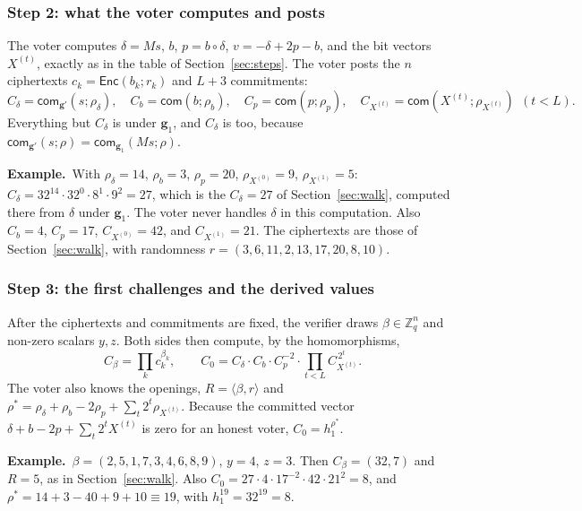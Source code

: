 \documentclass[11pt,a4paper]{article}
\newcommand{\Z}{\mathbb{Z}}
\newcommand{\Enc}{\mathsf{Enc}}
\newcommand{\com}{\mathsf{com}}
\newcommand{\ex}[1]{\par\medskip\noindent\textbf{Example.}~#1\par\medskip}
\theoremstyle{remark}
\begin{document}
\subsubsection*{Step 2: what the voter computes and posts}
The voter computes $\delta = Ms$, $b$, $p = b \circ \delta$, $v = -\delta
+ 2p - b$, and the bit vectors $X^{(t)}$, exactly as in the table of
Section~\ref{sec:steps}. The voter posts the $n$ ciphertexts $c_k =
\Enc(b_k; r_k)$ and $L + 3$ commitments:
\[
  C_\delta = \com_{\mathbf{g}'}(s; \rho_\delta), \quad
  C_b = \com(b; \rho_b), \quad
  C_p = \com(p; \rho_p), \quad
  C_{X^{(t)}} = \com(X^{(t)}; \rho_{X^{(t)}}) \ \ (t < L).
\]
Everything but $C_\delta$ is under $\mathbf{g}_1$, and $C_\delta$ is too,
because $\com_{\mathbf{g}'}(s; \rho) = \com_{\mathbf{g}_1}(Ms; \rho)$.

\ex{With $\rho_\delta = 14$, $\rho_b = 3$, $\rho_p = 20$, $\rho_{X^{(0)}}
= 9$, $\rho_{X^{(1)}} = 5$: $C_\delta = 32^{14} \cdot 32^{0} \cdot 8^{1}
\cdot 9^{2} = 27$, which is the $C_\delta = 27$ of
Section~\ref{sec:walk}, computed there from $\delta$ under
$\mathbf{g}_1$. The voter never handles $\delta$ in this computation.
Also $C_b = 4$, $C_p = 17$, $C_{X^{(0)}} = 42$, and $C_{X^{(1)}} = 21$.
The ciphertexts are those of Section~\ref{sec:walk}, with randomness $r =
(3, 6, 11, 2, 13, 17, 20, 8, 10)$.}

\subsubsection*{Step 3: the first challenges and the derived values}
After the ciphertexts and commitments are fixed, the verifier draws $\beta
\in \Z_q^{n}$ and non-zero scalars $y, z$. Both sides then compute, by the
homomorphisms,
\[
  C_\beta = \prod_k c_k^{\beta_k}, \qquad
  C_0 = C_\delta \cdot C_b \cdot C_p^{-2} \cdot \prod_{t < L} C_{X^{(t)}}^{\,2^{t}} .
\]
The voter also knows the openings, $R = \langle \beta, r \rangle$ and
$\rho^* = \rho_\delta + \rho_b - 2\rho_p + \sum_t 2^{t} \rho_{X^{(t)}}$.
Because the committed vector $\delta + b - 2p + \sum_t 2^{t} X^{(t)}$ is
zero for an honest voter, $C_0 = h_1^{\rho^*}$.

\ex{$\beta = (2, 5, 1, 7, 3, 4, 6, 8, 9)$, $y = 4$, $z = 3$. Then $C_\beta
= (32, 7)$ and $R = 5$, as in Section~\ref{sec:walk}. Also $C_0 = 27 \cdot
4 \cdot 17^{-2} \cdot 42 \cdot 21^{2} = 8$, and $\rho^* = 14 + 3 - 40 + 9
+ 10 \equiv 19$, with $h_1^{19} = 32^{19} = 8$.}
\end{document}
